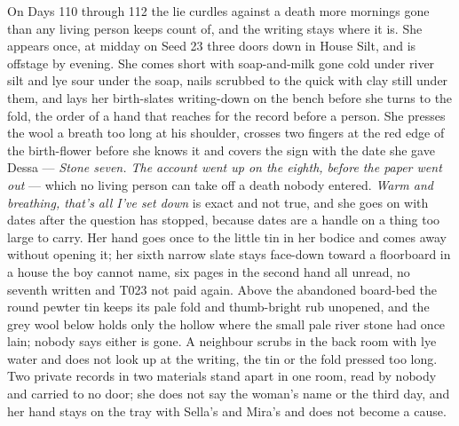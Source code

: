 \documentclass{design/chronicle}
\begin{document}
{On Days 110 through 112 the lie curdles against a death more mornings gone than any living person keeps count of, and the writing stays where it is. She appears once, at midday on Seed 23 three doors down in House Silt, and is offstage by evening. She comes short with soap-and-milk gone cold under river silt and lye sour under the soap, nails scrubbed to the quick with clay still under them, and lays her birth-slates writing-down on the bench before she turns to the fold, the order of a hand that reaches for the record before a person. She presses the wool a breath too long at his shoulder, crosses two fingers at the red edge of the birth-flower before she knows it and covers the sign with the date she gave Dessa — \emph{Stone seven. The account went up on the eighth, before the paper went out} — which no living person can take off a death nobody entered. \emph{Warm and breathing, that’s all I’ve set down} is exact and not true, and she goes on with dates after the question has stopped, because dates are a handle on a thing too large to carry. Her hand goes once to the little tin in her bodice and comes away without opening it; her sixth narrow slate stays face-down toward a floorboard in a house the boy cannot name, six pages in the second hand all unread, no seventh written and T023 not paid again. Above the abandoned board-bed the round pewter tin keeps its pale fold and thumb-bright rub unopened, and the grey wool below holds only the hollow where the small pale river stone had once lain; nobody says either is gone. A neighbour scrubs in the back room with lye water and does not look up at the writing, the tin or the fold pressed too long. Two private records in two materials stand apart in one room, read by nobody and carried to no door; she does not say the woman’s name or the third day, and her hand stays on the tray with Sella’s and Mira’s and does not become a cause.

}
\end{document}

